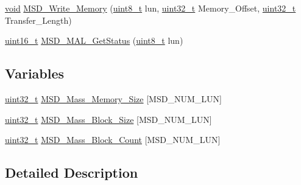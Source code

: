 \begin{DoxyCompactItemize}
\hyperlink{group___n_a_m_e_ga18028b8badbf1ea7e704ccac3c488e82}{void} \hyperlink{group___m_s_d_gad3bccdf4d261868a7e93d1314448e086}{M\-S\-D\-\_\-\-Write\-\_\-\-Memory} (\hyperlink{stdint_8h_aba7bc1797add20fe3efdf37ced1182c5}{uint8\-\_\-t} lun, \hyperlink{stdint_8h_a435d1572bf3f880d55459d9805097f62}{uint32\-\_\-t} Memory\-\_\-\-Offset, \hyperlink{stdint_8h_a435d1572bf3f880d55459d9805097f62}{uint32\-\_\-t} Transfer\-\_\-\-Length)
\item 
\hyperlink{stdint_8h_a273cf69d639a59973b6019625df33e30}{uint16\-\_\-t} \hyperlink{group___m_s_d_ga0ba8031b6708d1ac42b5d44253ff72b5}{M\-S\-D\-\_\-\-M\-A\-L\-\_\-\-Get\-Status} (\hyperlink{stdint_8h_aba7bc1797add20fe3efdf37ced1182c5}{uint8\-\_\-t} lun)
\end{DoxyCompactItemize}
\subsection*{Variables}
\begin{DoxyCompactItemize}
\item 
\hyperlink{stdint_8h_a435d1572bf3f880d55459d9805097f62}{uint32\-\_\-t} \hyperlink{group___m_s_d_ga3fe9a9d76cb3d07f2082abb68b80b579}{M\-S\-D\-\_\-\-Mass\-\_\-\-Memory\-\_\-\-Size} \mbox{[}M\-S\-D\-\_\-\-N\-U\-M\-\_\-\-L\-U\-N\mbox{]}
\item 
\hyperlink{stdint_8h_a435d1572bf3f880d55459d9805097f62}{uint32\-\_\-t} \hyperlink{group___m_s_d_ga306ebe3d8bfd39f241d763c6323db7f4}{M\-S\-D\-\_\-\-Mass\-\_\-\-Block\-\_\-\-Size} \mbox{[}M\-S\-D\-\_\-\-N\-U\-M\-\_\-\-L\-U\-N\mbox{]}
\item 
\hyperlink{stdint_8h_a435d1572bf3f880d55459d9805097f62}{uint32\-\_\-t} \hyperlink{group___m_s_d_gab51992051c34882c65172781f1215cd4}{M\-S\-D\-\_\-\-Mass\-\_\-\-Block\-\_\-\-Count} \mbox{[}M\-S\-D\-\_\-\-N\-U\-M\-\_\-\-L\-U\-N\mbox{]}
\end{DoxyCompactItemize}


\subsection{Detailed Description}


